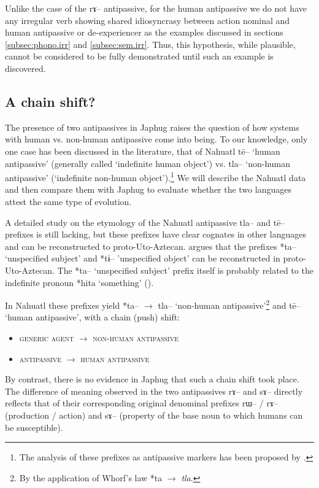 \documentclass[oldfontcommands,oneside,a4paper,11pt]{article}
\newcommand{\ipa}[1]{{\phon \mbox{#1}}} %
\begin{document}
Unlike the case of the \ipa{rɤ}-- antipassive, for the human antipassive we do not have any irregular verb showing shared idiosyncrasy between action nominal and human antipassive or de-experiencer as the examples discussed in sections \ref{subsec:phono.irr} and  \ref{subsec:sem.irr}. Thus, this hypothesis, while plausible, cannot be considered to be fully demonstrated until such an example is discovered.
 
\subsection{A chain shift?} \label{subsec:chain}
The presence of two antipassives in Japhug raises the question of how systems with human vs. non-human antipassive come into being. To our knowledge, only one case has been discussed in the literature, that of Nahuatl \ipa{tē}-- `human antipassive' (generally called `indefinite human object') vs. \ipa{tla}-- `non-human antipassive' (`indefinite non-human object').\footnote{The analysis of these prefixes as antipassive markers has been proposed by \citet[91]{creissels06sgit2}.} We will describe  the Nahuatl data and then compare  them with Japhug to evaluate whether the two languages attest the same type of evolution.


A detailed study on the etymology of the Nahuatl antipassive \ipa{tla}-- and \ipa{tē}-- prefixes is still lacking, but these prefixes have clear cognates in other languages and can be reconstructed to proto-Uto-Aztecan. \citet[46]{langacker77ua} argues that  the prefixes *\ipa{ta--} `unspecified subject'  and *\ipa{tɨ--} 'unspecified object'   can be reconstructed in proto-Uto-Aztecan. The *\ipa{ta--} `unspecified subject' prefix itself is probably related to the indefinite pronoun *\ipa{hita} `something' (\citealt[120]{langacker77ua}).


In Nahuatl these prefixes yield *\ipa{ta--} $\rightarrow$ \ipa{tla}-- `non-human antipassive'\footnote{By the application of Whorf's law *\ipa{ta} $\rightarrow$ \textit{tla}.} and \ipa{tē}-- `human antipassive', with a chain (push) shift: 

\begin{itemize}
\item \textsc{generic agent} $\rightarrow$ \textsc{non-human antipassive}
\item \textsc{antipassive} $\rightarrow$ \textsc{human antipassive}
\end{itemize}

By contrast, there is no evidence in Japhug that such a chain shift took place. The difference of meaning observed in the two antipassives \ipa{rɤ}-- and \ipa{sɤ}-- directly reflects that of their corresponding original denominal prefixes \ipa{rɯ}-- / \ipa{rɤ}-- (production / action) and   \ipa{sɤ}-- (property of the base noun to which humans can be susceptible). 
\end{document}
